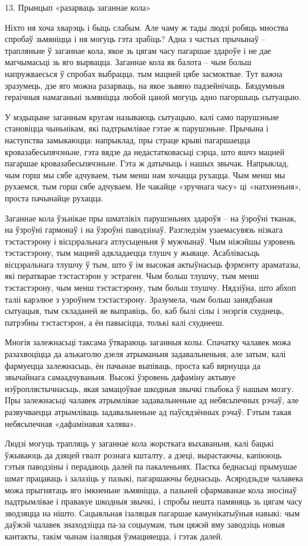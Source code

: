 13. Прынцып «разарваць заганнае кола»

Ніхто ня хоча хварэць і быць слабым. Але чаму ж тады людзі робяць мноства спробаў зьмяніцца і ня могуць гэта зрабіць? Адна з частых прычынаў – трапляньне ў заганнае кола, якое зь цягам часу пагаршае здароўе і не дае магчымасьці зь яго вырвацца. Заганнае кола як балота – чым больш напружваесься ў спробах выбрацца, тым мацней цябе засмоктвае. Тут важна зразумець, дзе яго можна разарваць, на якое зьвяно падзейнічаць. Бяздумныя гераічныя намаганьні зьмяніцца любой цаной могуць адно пагоршыць сытуацыю.

У мэдыцыне заганным кругам называюць сытуацыю, калі само парушэньне становіцца чыньнікам, які падтрымлівае гэтае ж парушэньне. Прычына і наступства замыкаюцца: напрыклад, пры страце крыві пагаршаецца кровазабесьпячэньне, гэта вядзе да недастатковасьці сэрца, што яшчэ мацней пагаршае кровазабесьпячэньне. Гэта ж датычыць і нашых звычак. Напрыклад, чым горш мы сябе адчуваем, тым менш нам хочацца рухацца. Чым менш мы рухаемся, тым горш сябе адчуваем. Не чакайце «зручнага часу» ці «натхненьня», проста пачынайце рухацца.

Заганнае кола ўзьнікае пры шматлікіх парушэньнях здароўя – на ўзроўні тканак, на ўзроўні гармонаў і на ўзроўні паводзінаў. Разгледзім узаемасувязь нізкага тэстастэрону і вісцэральнага атлусьценьня ў мужчынаў. Чым ніжэйшы узровень тэстастэрону, тым мацней адкладаецца тлушч у жываце. Асаблівасьць вісцэральнага тлушчу ў тым, што ў ім высокая актыўнасьць фэрмэнту араматазы, які ператварае тэстастэрон у эстраген. Чым больш тлушчу, тым менш тэстастэрону, чым менш тэстастэрону, тым больш тлушчу. Нядзіўна, што абхоп таліі карэлюе з узроўнем тэстастэрону. Зразумела, чым больш занядбаная сытуацыя, тым складаней яе выправіць, бо, каб былі сілы і энэргія схуднець, патрэбны тэстастэрон, а ён павысіцца, толькі калі схуднееш.

Многія залежнасьці таксама ўтвараюць заганныя колы. Спачатку чалавек можа разахвоціцца да алькаголю дзеля атрыманьня задавальненьня, але затым, калі фармуецца залежнасьць, ён пачынае выпіваць, проста каб вярнуцца да звычайнага самаадчуваньня. Высокі ўзровень дафаміну актывуе нэўроплястычнасьць, якая замацоўвае шкодныя звычкі глыбока ў нашым мозгу. Пры залежнасьці чалавек атрымлівае задавальненьне ад небясьпечных рэчаў, але развучваецца атрымліваць задавальненьне ад паўсядзённых рэчаў. Гэтым такая небясьпечная «дафамінавая халява».

Людзі могуць трапляць у заганнае кола жорсткага выхаваньня, калі бацькі ўжываюць да дзяцей гвалт рознага кшталту, а дзеці, вырастаючы, капіююць гэтыя паводзіны і перадаюць далей па пакаленьнях. Пастка беднасьці прымушае шмат працаваць і залазіць у пазыкі, пагаршаючы беднасьць. Асяродзьдзе чалавека можа прыгнятаць яго імкненьне зьмяніцца, а пазьней сфармаванае кола зносінаў падтрымлівае і правакуе шкодныя звычкі, і спробы нешта памяняць зь цягам часу зводзяцца на нішто. Сацыяльная ізаляцыя пагаршае камунікатыўныя навыкі: чым даўжэй чалавек знаходзіцца па-за соцыумам, тым цяжэй яму заводзіць новыя кантакты, такім чынам ізаляцыя ўзмацняецца, і гэтак далей.

